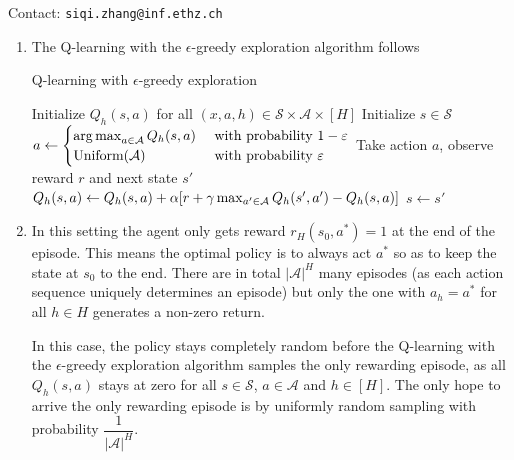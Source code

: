 Contact: \texttt{siqi.zhang@inf.ethz.ch}


\begin{Solution}
    \begin{enumerate} [label=\alph*)]
        \item
        The Q-learning with the $\epsilon$-greedy exploration algorithm follows
        \begin{algorithm}[H]
    	\caption{Q-learning with $\epsilon$-greedy exploration}
    	\color{blue}
    	\begin{algorithmic}[1]
    		\REQUIRE Initialize $Q_h(s,a)$ for all $(x,a,h)\in\mathcal{S}\times\mathcal{A}\times[H]$
                \STATE Initialize $s \in \mathcal{S}$
                    \STATE $a \leftarrow
                    \begin{cases} \operatorname*{arg\,max}_{a \in \mathcal{A}} Q_h(s,a) & \text { with probability } 1-\varepsilon \\
                    \text{Uniform}(\mathcal{A}) & \text { with probability } \varepsilon
                    \end{cases}
                    $
                    \STATE Take action $a$, observe reward $r$ and next state $s'$
                    \STATE
                    $
                    Q_h(s,a) \leftarrow Q_h(s,a) + \alpha {\left[r + \gamma \max_{a' \in \mathcal{A}} Q_h(s', a') - Q_h(s,a)\right]}
                    $
                    \STATE $ s \leftarrow s' $
                \ENDFOR
                \ENDFOR
    	    \end{algorithmic}
        \end{algorithm}
        
        \item
        In this setting the agent only gets reward $ r_H(s_0, a^*)=1 $ at the end of the episode. This means the optimal policy is to always act $a^*$ so as to keep the state at $s_0$ to the end. There are in total $|\mathcal{A}|^H$ many episodes (as each action sequence uniquely determines an episode) but only the one with $a_h = a^*$ for all $h \in H$ generates a non-zero return.
        
        In this case, the policy stays completely random before the Q-learning with the $\epsilon$-greedy exploration algorithm samples the only rewarding episode, as all $Q_h(s,a)$ stays at zero for all $s \in \mathcal{S}$, $a \in \mathcal{A}$ and $h \in [H]$. The only hope to arrive the only rewarding episode is by uniformly random sampling with probability $\dfrac{1}{|\mathcal{A}|^H}$.
        

\end{enumerate}
\end{Solution}

